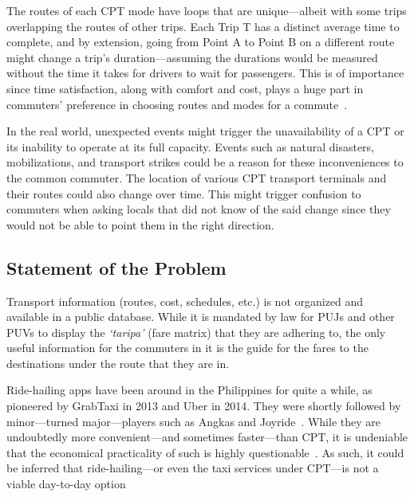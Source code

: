 \documentclass{icsthesis}
\begin{document}
\begin{mainmatter}
The routes of each CPT mode have loops that are unique---albeit with some trips overlapping the routes of other trips. Each Trip T has a distinct average time to complete, and by extension, going from Point A to Point B on a different route might change a trip's duration---assuming the durations would be measured without the time it takes for drivers to wait for passengers.
This is of importance since time satisfaction, along with comfort and cost, plays a huge part in commuters' preference in choosing routes and modes for a commute~\citep{Mayo20}.

In the real world, unexpected events might trigger the unavailability of a CPT or its inability to operate at its full capacity. Events such as natural disasters, mobilizations, and transport strikes could be a reason for these inconveniences to the common commuter.
The location of various CPT transport terminals and their routes could also change over time. This might trigger confusion to commuters when asking locals that did not know of the said change since they would not be able to point them in the right direction. \\ %


\subsection{Statement of the Problem}
Transport information (routes, cost, schedules, etc.) is not organized and available in a public database. While it is mandated by law for PUJs and other PUVs to display the \textit{`taripa'} (fare matrix) that they are adhering to, the only useful information for the commuters in it is the guide for the fares to the destinations under the route that they are in. 

Ride-hailing apps have been around in the Philippines for quite a while, as pioneered by GrabTaxi in 2013 and Uber in 2014. They were shortly followed by minor---turned major---players such as Angkas and Joyride~\citep{RamizoJr19}. While they are undoubtedly more convenient---and sometimes faster---than CPT, it is undeniable that the economical practicality of such is highly questionable~\citep{RamizoJr19}.
As such, it could be inferred that ride-hailing---or even the taxi services under CPT---is not a viable day-to-day option 


\end{mainmatter}
\end{document}
